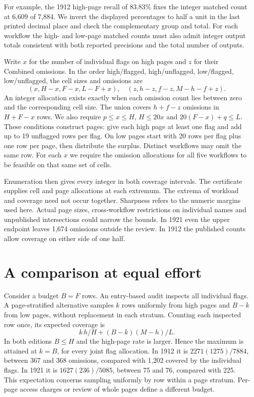 \documentclass[11pt]{article}
\begin{document}
For example, the 1912 high-page recall of 83.83\% fixes the integer matched count at 6,609 of 7,884. We invert the displayed percentages to half a unit in the last printed decimal place and check the complementary group and total. For each workflow the high- and low-page matched counts must also admit integer output totals consistent with both reported precisions and the total number of outputs.

Write $x$ for the number of individual flags on high pages and $z$ for their Combined omissions. In the order high/flagged, high/unflagged, low/flagged, low/unflagged, the cell sizes and omissions are
\[
(x,H-x,F-x,L-F+x),\quad (z,h-z,f-z,M-h-f+z).
\]
An integer allocation exists exactly when each omission count lies between zero and the corresponding cell size. The union covers $h+f-z$ omissions in $H+F-x$ rows. We also require $p\le x\le H$, $H\le20x$ and $20(F-x)+q\le L$. These conditions construct pages: give each high page at least one flag and add up to 19 unflagged rows per flag. On low pages start with 20 rows per flag plus one row per page, then distribute the surplus. Distinct workflows may omit the same row. For each $x$ we require the omission allocations for all five workflows to be feasible on that same set of cells.

Enumeration then gives every integer in both coverage intervals. The certificate supplies cell and page allocations at each extremum. The extrema of workload and coverage need not occur together. Sharpness refers to the numeric margins used here. Actual page sizes, cross-workflow restrictions on individual names and unpublished intersections could narrow the bounds. In 1921 even the upper endpoint leaves 1,674 omissions outside the review. In 1912 the published counts allow coverage on either side of one half.

\newpage
\section*{A comparison at equal effort}
Consider a budget $B=F$ rows. An entry-based audit inspects all individual flags. A page-stratified alternative samples $k$ rows uniformly from high pages and $B-k$ from low pages, without replacement in each stratum. Counting each inspected row once, its expected coverage is
\[
 k\,h/H+(B-k)(M-h)/L .
\]
In both editions $B\le H$ and the high-page rate is larger. Hence the maximum is attained at $k=B$, for every joint flag allocation. In 1912 it is $2271(1275)/7884$, between 367 and 368 omissions, compared with 1,202 covered by the individual flags. In 1921 it is $1627(236)/5085$, between 75 and 76, compared with 225. This expectation concerns sampling uniformly by row within a page stratum. Per-page access charges or review of whole pages define a different budget.
\end{document}

